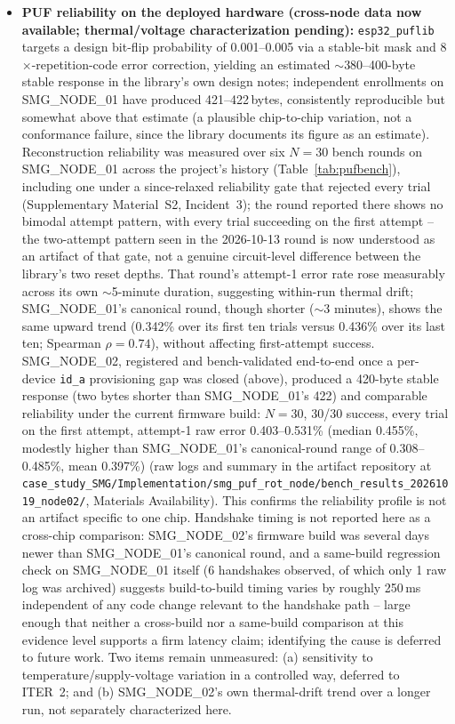 \documentclass[preprint,12pt,authoryear]{elsarticle}
\begin{document}
\begin{sloppypar}
\begin{itemize}[leftmargin=*]
    \item \textbf{PUF reliability on the deployed hardware (cross-node data now available; thermal/voltage characterization pending):} \texttt{esp32\_puflib} targets a design bit-flip probability of 0.001--0.005 via a stable-bit mask and 8$\times$-repetition-code error correction, yielding an estimated $\sim$380--400-byte stable response in the library's own design notes; independent enrollments on SMG\_NODE\_01 have produced 421--422\,bytes, consistently reproducible but somewhat above that estimate (a plausible chip-to-chip variation, not a conformance failure, since the library documents its figure as an estimate). Reconstruction reliability was measured over six $N=30$ bench rounds on SMG\_NODE\_01 across the project's history (Table~\ref{tab:pufbench}), including one under a since-relaxed reliability gate that rejected every trial (Supplementary Material~S2, Incident~3); the round reported there shows no bimodal attempt pattern, with every trial succeeding on the first attempt -- the two-attempt pattern seen in the 2026-10-13 round is now understood as an artifact of that gate, not a genuine circuit-level difference between the library's two reset depths. That round's attempt-1 error rate rose measurably across its own $\sim$5-minute duration, suggesting within-run thermal drift; SMG\_NODE\_01's canonical round, though shorter ($\sim$3 minutes), shows the same upward trend (0.342\% over its first ten trials versus 0.436\% over its last ten; Spearman $\rho=0.74$), without affecting first-attempt success. SMG\_NODE\_02, registered and bench-validated end-to-end once a per-device \texttt{id\_a} provisioning gap was closed (above), produced a 420-byte stable response (two bytes shorter than SMG\_NODE\_01's 422) and comparable reliability under the current firmware build: $N=30$, 30/30 success, every trial on the first attempt, attempt-1 raw error 0.403--0.531\% (median 0.455\%, modestly higher than SMG\_NODE\_01's canonical-round range of 0.308--0.485\%, mean 0.397\%) (raw logs and summary in the artifact repository at \texttt{case\_study\_SMG/\allowbreak Implementation/\allowbreak smg\_puf\_rot\_node/\allowbreak bench\_results\_20261019\_node02/}, Materials Availability). This confirms the reliability profile is not an artifact specific to one chip. Handshake timing is not reported here as a cross-chip comparison: SMG\_NODE\_02's firmware build was several days newer than SMG\_NODE\_01's canonical round, and a same-build regression check on SMG\_NODE\_01 itself (6 handshakes observed, of which only 1 raw log was archived) suggests build-to-build timing varies by roughly 250\,ms independent of any code change relevant to the handshake path -- large enough that neither a cross-build nor a same-build comparison at this evidence level supports a firm latency claim; identifying the cause is deferred to future work. Two items remain unmeasured: (a) sensitivity to temperature/supply-voltage variation in a controlled way, deferred to ITER~2; and (b) SMG\_NODE\_02's own thermal-drift trend over a longer run, not separately characterized here.

\end{itemize}
\end{sloppypar}
\end{document}
